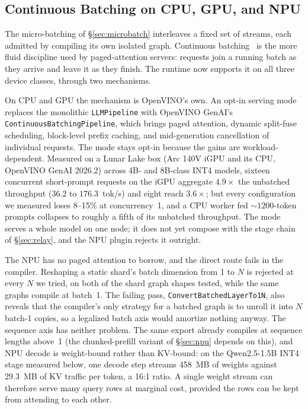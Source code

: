 \documentclass[11pt]{article}
\begin{document}
\subsection{Continuous Batching on CPU, GPU, and NPU}
\label{sec:packed}

The micro-batching of \S\ref{sec:microbatch} interleaves a fixed set of streams, each admitted by compiling its own isolated graph. Continuous batching~\cite{yu2022orca} is the more fluid discipline used by paged-attention servers: requests join a running batch as they arrive and leave it as they finish. The runtime now supports it on all three device classes, through two mechanisms.

On CPU and GPU the mechanism is OpenVINO's own. An opt-in serving mode replaces the monolithic \texttt{LLMPipeline} with OpenVINO GenAI's \texttt{ContinuousBatchingPipeline}, which brings paged attention, dynamic split-fuse scheduling, block-level prefix caching, and mid-generation cancellation of individual requests. The mode stays opt-in because the gains are workload-dependent. Measured on a Lunar Lake box (Arc 140V iGPU and its CPU, OpenVINO GenAI 2026.2) across 4B- and 8B-class INT4 models, sixteen concurrent short-prompt requests on the iGPU aggregate $4.9\times$ the unbatched throughput ($36.2$ to $176.3$~tok/s) and eight reach $3.6\times$; but every configuration we measured loses 8--15\% at concurrency~1, and a CPU worker fed ${\sim}1200$-token prompts collapses to roughly a fifth of its unbatched throughput. The mode serves a whole model on one node; it does not yet compose with the stage chain of \S\ref{sec:relay}, and the NPU plugin rejects it outright.

The NPU has no paged attention to borrow, and the direct route fails in the compiler. Reshaping a static shard's batch dimension from 1 to $N$ is rejected at every $N$ we tried, on both of the shard graph shapes tested, while the same graphs compile at batch~1. The failing pass, \texttt{ConvertBatchedLayerTo1N}, also reveals that the compiler's only strategy for a batched graph is to unroll it into $N$ batch-1 copies, so a legalized batch axis would amortize nothing anyway. The sequence axis has neither problem. The same export already compiles at sequence lengths above~1 (the chunked-prefill variant of \S\ref{sec:npu} depends on this), and NPU decode is weight-bound rather than KV-bound: on the Qwen2.5-1.5B INT4 stage measured below, one decode step streams 458~MB of weights against 29.3~MB of KV traffic per token, a 16:1 ratio. A single weight stream can therefore serve many query rows at marginal cost, provided the rows can be kept from attending to each other.
\end{document}

